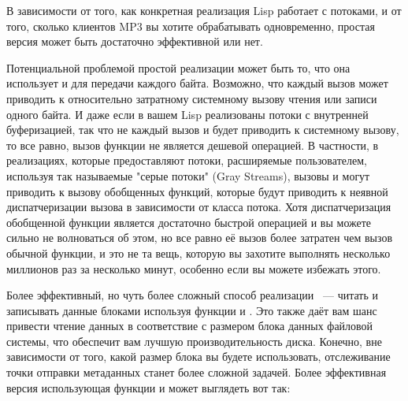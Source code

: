 В зависимости от того, как конкретная реализация Lisp работает с потоками, и от того,
сколько клиентов MP3 вы хотите обрабатывать одновременно, простая версия
 может быть достаточно эффективной или нет.

Потенциальной проблемой простой реализации может быть то, что она использует
 и  для передачи каждого байта. Возможно, что каждый
вызов может приводить к относительно затратному системному вызову чтения или записи одного
байта.  И даже если в вашем Lisp реализованы потоки с внутренней буферизацией, так что не
каждый вызов  и  будет приводить к системному вызову, то
все равно, вызов функции не является дешевой операцией.  В частности, в реализациях,
которые предоставляют потоки, расширяемые пользователем, используя так называемые "серые
потоки" (Gray Streams), вызовы  и  могут приводить к
вызову обобщенных функций, которые будут приводить к неявной диспатчеризации вызова в
зависимости от класса потока.  Хотя диспатчеризация обобщенной функции является достаточно
быстрой операцией и вы можете сильно не волноваться об этом, но все равно её вызов более
затратен чем вызов обычной функции, и это не та вещь, которую вы захотите выполнять
несколько миллионов раз за несколько минут, особенно если вы можете избежать этого.

Более эффективный, но чуть более сложный способ реализации ~--- читать и
записывать данные блоками используя функции  и .
Это также даёт вам шанс привести чтение данных в соответствие с размером блока данных
файловой системы, что обеспечит вам лучшую производительность диска.  Конечно, вне
зависимости от того, какой размер блока вы будете использовать, отслеживание точки
отправки метаданных станет более сложной задачей.  Более эффективная версия
 использующая функции  и 
может выглядеть вот так:


